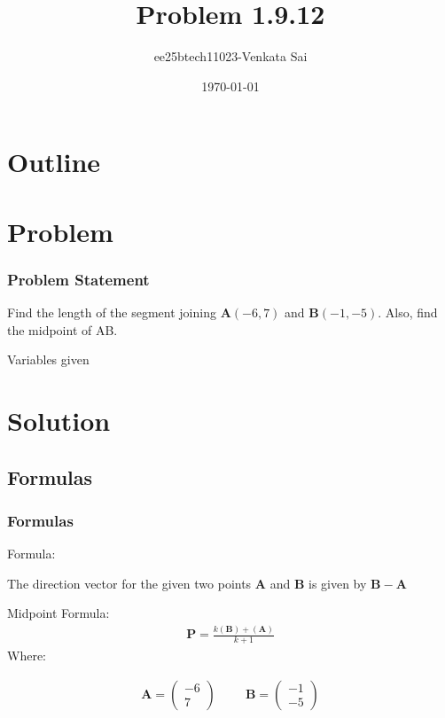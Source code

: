 \documentclass{beamer}
\title{Problem 1.9.12}
\author{ee25btech11023-Venkata Sai}
\date{\today}
\providecommand{\brak}[1]{\ensuremath{\left(#1\right)}}
\theoremstyle{remark}
\newcommand{\myvec}[1]{\ensuremath{\begin{pmatrix}#1\end{pmatrix}}}
\let\vec\mathbf
\numberwithin{equation}{section}
\begin{document}
\begin{frame}
\titlepage
\end{frame}

\section*{Outline}
\begin{frame}
\tableofcontents
\end{frame}
\section{Problem}
\begin{frame}
\frametitle{Problem Statement}
%
Find the length of the segment joining \textbf{A}$\brak{-6,7}$ and \textbf{B}$\brak{-1,-5}$. Also, find the
midpoint of AB. 
 \begin{table}[h!]    
  \centering
  
  \caption{Variables given}
  \label{tab 1.4.9.2}
\end{table}
\end{frame}

\section{Solution}
\subsection{Formulas}
\setcounter{section}{1}
\begin{frame}
\frametitle{Formulas}
Formula:

The direction vector for the given two points $\vec{A}$ and $\vec{B}$ is given by $\vec{B}-\vec{A}$

Midpoint Formula:
\begin{align}
   \vec{P}=\frac{k(\vec{B})+(\vec{A})}{k+1}
\end{align}
Where: 


\begin{align}
\vec{A}=\myvec{-6\\7} \hspace{1cm} \vec{B}=\myvec{-1\\-5} 
\end{align}

\end{frame}
\end{document}
